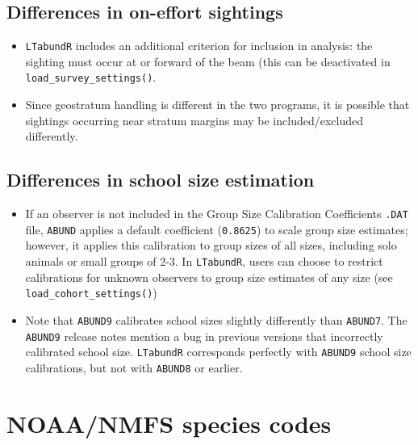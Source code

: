 \documentclass[
]{book}
\begin{document}
\hypertarget{differences-in-on-effort-sightings}{%
\section*{Differences in on-effort sightings}\label{differences-in-on-effort-sightings}}

\begin{itemize}
\item
  \texttt{LTabundR} includes an additional criterion for inclusion in analysis: the sighting must occur at or forward of the beam (this can be deactivated in \texttt{load\_survey\_settings()}.
\item
  Since geostratum handling is different in the two programs, it is possible that sightings occurring near stratum margins may be included/excluded differently.
\end{itemize}

\hypertarget{differences-in-school-size-estimation}{%
\section*{Differences in school size estimation}\label{differences-in-school-size-estimation}}

\begin{itemize}
\item
  If an observer is not included in the Group Size Calibration Coefficients \texttt{.DAT} file, \texttt{ABUND} applies a default coefficient (\texttt{0.8625}) to scale group size estimates; however, it applies this calibration to group sizes of all sizes, including solo animals or small groups of 2-3. In \texttt{LTabundR}, users can choose to restrict calibrations for unknown observers to group size estimates of any size (see \texttt{load\_cohort\_settings()})
\item
  Note that \texttt{ABUND9} calibrates school sizes slightly differently than \texttt{ABUND7}. The \texttt{ABUND9} release notes mention a bug in previous versions that incorrectly calibrated school size. \texttt{LTabundR} corresponds perfectly with \texttt{ABUND9} school size calibrations, but not with \texttt{ABUND8} or earlier.
\end{itemize}

\hypertarget{spp_codes}{%
\chapter{NOAA/NMFS species codes}\label{spp_codes}}
\end{document}
